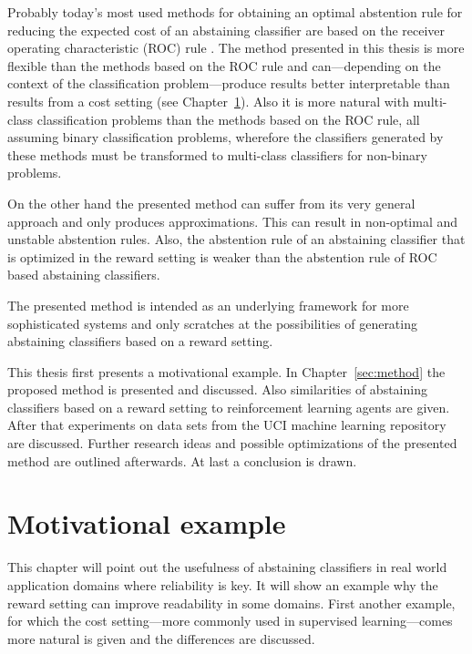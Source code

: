 \documentclass[twoside,11pt]{article}
\begin{document}
Probably today's most used methods for obtaining an
optimal abstention rule for reducing the expected cost of
an abstaining classifier are based on the receiver
operating characteristic (ROC) rule
\citep[see][]{tortella_2000,pietraszek_2005,
  vanderlooy_et_al_2009, guan_et_al_2018}.
The method presented in this thesis is more flexible than
the methods based on the ROC rule and can---depending on
the context of the classification problem---produce results
better interpretable than results from a cost setting
(see Chapter~\ref{sec:example}).
Also it is more natural with multi-class classification
problems than the methods based on the ROC rule, all
assuming binary classification problems, wherefore the
classifiers generated by these methods must be transformed
to multi-class classifiers for non-binary problems.

On the other hand the presented method can suffer from its
very general approach and only produces approximations.
This can result in non-optimal and unstable abstention
rules.
Also, the abstention rule of an abstaining classifier that
is optimized in the reward setting is weaker than the
abstention rule of ROC based abstaining classifiers.

The presented method is intended as an underlying
framework for more sophisticated systems and only scratches
at the possibilities of generating abstaining classifiers
based on a reward setting.

This thesis first presents a motivational example.
In Chapter~\ref{sec:method} the proposed method is
presented and discussed.
Also similarities of abstaining classifiers based on a
reward setting to reinforcement learning agents are given.
After that experiments on data sets from the UCI machine
learning repository \citep[see][]{uci} are discussed.
Further research ideas and possible optimizations of the
presented method are outlined afterwards.
At last a conclusion is drawn.

\section{Motivational example}
\label{sec:example}

This chapter will point out the usefulness of abstaining
classifiers in real world application domains where
reliability is key.
It will show an example why the reward setting can improve
readability in some domains.
First another example, for which the cost setting---more
commonly used in supervised learning---comes more natural
is given and the differences are discussed.
\end{document}
